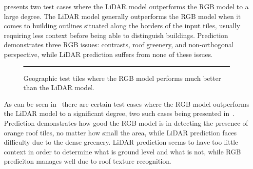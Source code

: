  presents two test cases where the LiDAR model outperforms the RGB model to a large degree.  %
The LiDAR model generally outperforms the RGB model when it comes to building outlines situated along the borders of the input tiles, usually requiring less context before being able to distinguish buildings.
Prediction  demonstrates three RGB issues: contrasts, roof greenery, and non-orthogonal perspective, while LiDAR prediction  suffers from none of these issues.

\begin{figure}[H]
  \centering
  \rule[1ex]{\textwidth}{.5pt}
  \caption{%
    Geographic test tiles where the RGB model performs much better than the LiDAR model.
  }%
  \label{fig:rgb-better-than-lidar}
\end{figure}

As can be seen in~ there are certain test cases where the RGB model outperforms the LiDAR model to a significant degree, two such cases being presented in~.
Prediction  demonstrates how good the RGB model is in detecting the presence of orange roof tiles, no matter how small the area, while LiDAR prediction  faces difficulty due to the dense greenery.
LiDAR prediction  seems to have too little context in order to determine what is ground level and what is not, while RGB prediciton  manages well due to roof texture recognition.
